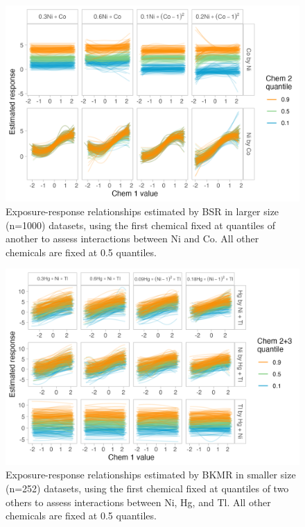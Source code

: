 \documentclass[12pt, twoside]{amherstthesis}
\begin{document}
\begin{figure}

{\centering \includegraphics[width=0.85\linewidth]{figures/ch4_slg_biv_expresp_3} 

}

\caption{Exposure-response relationships estimated by BSR in larger size (n=1000) datasets, using the first chemical fixed at quantiles of another to assess interactions between Ni and Co. All other chemicals are fixed at 0.5 quantiles.}\label{fig:slgnico}
\end{figure}
\begin{figure}

{\centering \includegraphics[width=0.85\linewidth]{figures/ch4_ksm_triv_expresp} 

}

\caption{Exposure-response relationships estimated by BKMR in smaller size (n=252) datasets, using the first chemical fixed at quantiles of two others to assess interactions between Ni, Hg, and Tl. All other chemicals are fixed at 0.5 quantiles.}\label{fig:ksmtri}
\end{figure}
\end{document}
